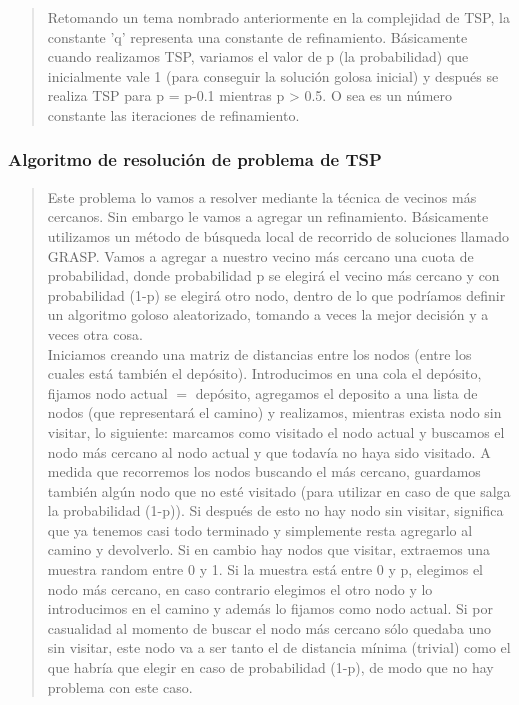 \documentclass[11pt,a4paper]{article}
\begin{document}
\begin{verse}
\bigskip
Retomando un tema nombrado anteriormente en la complejidad de TSP, la constante 'q' representa una constante de refinamiento. Básicamente cuando realizamos TSP, variamos el valor de p (la probabilidad) que inicialmente vale 1 (para conseguir la solución golosa inicial) y después se realiza TSP para p = p-0.1 mientras p > 0.5. O sea es un número constante las iteraciones de refinamiento.

\end{verse}


\subsubsection{Algoritmo de resolución de problema de TSP}

\begin{verse}
Este problema lo vamos a resolver mediante la técnica de vecinos más cercanos. Sin embargo le vamos a agregar un refinamiento. Básicamente utilizamos un método de búsqueda local de recorrido de soluciones llamado GRASP. Vamos a agregar a nuestro vecino más cercano una cuota de probabilidad, donde probabilidad p se elegirá el vecino más cercano y con probabilidad (1-p) se elegirá otro nodo, dentro de lo que podríamos definir un algoritmo goloso aleatorizado, tomando a veces la mejor decisión y a veces otra cosa.
\\Iniciamos creando una matriz de distancias entre los nodos (entre los cuales está también el depósito). Introducimos en una cola el depósito, fijamos nodo actual $=$ depósito, agregamos el deposito a una lista de nodos (que representará el camino) y realizamos, mientras exista nodo sin visitar, lo siguiente: marcamos como visitado el nodo actual y buscamos el nodo más cercano al nodo actual y que todavía no haya sido visitado. A medida que recorremos los nodos buscando el más cercano, guardamos también algún nodo que no esté visitado (para utilizar en caso de que salga la probabilidad (1-p)). Si después de esto no hay nodo sin visitar, significa que ya tenemos casi todo terminado y simplemente resta agregarlo al camino y devolverlo. Si en cambio hay nodos que visitar, extraemos una muestra random entre 0 y 1. Si la muestra está entre 0 y p, elegimos el nodo más cercano, en caso contrario elegimos el otro nodo y lo introducimos en el camino y además lo fijamos como nodo actual. Si por casualidad al momento de buscar el nodo más cercano sólo quedaba uno sin visitar, este nodo va a ser tanto el de distancia mínima (trivial) como el que habría que elegir en caso de probabilidad (1-p), de modo que no hay problema con este caso.
\end{verse}
\end{document}

